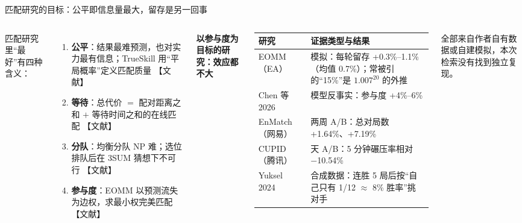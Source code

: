 \documentclass[aspectratio=169,11pt]{beamer}
\newcommand{\evtag}[2]{\mbox{\textcolor{#1}{\scriptsize【#2】}}}
\newcommand{\tagLit}{\evtag{cBlue}{文献}}
\newcommand{\looselist}{\setlength{\itemsep}{4pt}\setlength{\parskip}{0pt}}
\begin{document}
\begin{frame}{匹配研究的目标：公平即信息量最大，留存是另一回事}
\begin{columns}[T,onlytextwidth]
\small
匹配研究里“最好”有四种含义：
\begin{enumerate}\looselist
  \item \textbf{公平}：结果最难预测，也对实力最有信息；TrueSkill 用“平局概率”定义匹配质量 \tagLit
  \item \textbf{等待}：总代价 $=$ 配对距离之和 $+$ 等待时间之和的在线匹配 \tagLit
  \item \textbf{分队}：均衡分队 NP 难；选位排队后在 3SUM 猜想下不可行 \tagLit
  \item \textbf{参与度}：EOMM 以预测流失为边权，求最小权完美匹配 \tagLit
\end{enumerate}
\footnotesize
\textbf{以参与度为目标的研究：效应都不大}\par\smallskip
\renewcommand{\arraystretch}{1.25}
\begin{tabularx}{\linewidth}{@{}>{\raggedright\arraybackslash}p{2.2cm}>{\raggedright\arraybackslash}X@{}}
\toprule
研究 & 证据类型与结果 \\
\midrule
EOMM（EA） & 模拟：每轮留存 +0.3\%–1.1\%（均值 0.7\%）；常被引的“15\%”是 $1.007^{20}$ 的外推 \\
Chen 等 2026 & 模型反事实：参与度 +4\%–6\% \\
EnMatch（网易） & 两周 A/B：总对局数 +1.64\%、+7.19\% \\
CUPID（腾讯） & 30 天 A/B：5 分钟碾压率相对 −10.54\% \\
Yuksel 2024 & 合成数据：连胜 5 局后按“自己只有 1/12 $\approx$ 8\% 胜率”挑对手 \\
\bottomrule
\end{tabularx}
\par\smallskip
{\scriptsize\color{inkMuted}全部来自作者自有数据或自建模拟，本次检索没有找到独立复现。}
\end{columns}
\end{frame}
\end{document}
